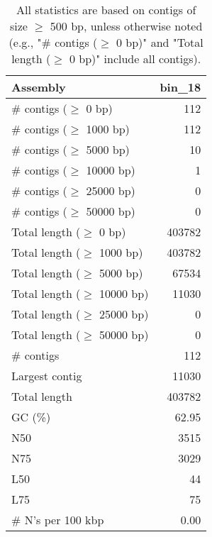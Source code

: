 \documentclass[12pt,a4paper]{article}
\begin{document}
\begin{table}[ht]
\begin{center}
\caption{All statistics are based on contigs of size $\geq$ 500 bp, unless otherwise noted (e.g., "\# contigs ($\geq$ 0 bp)" and "Total length ($\geq$ 0 bp)" include all contigs).}
\begin{tabular}{|l*{1}{|r}|}
\hline
Assembly & bin\_18 \\ \hline
\# contigs ($\geq$ 0 bp) & 112 \\ \hline
\# contigs ($\geq$ 1000 bp) & 112 \\ \hline
\# contigs ($\geq$ 5000 bp) & 10 \\ \hline
\# contigs ($\geq$ 10000 bp) & 1 \\ \hline
\# contigs ($\geq$ 25000 bp) & 0 \\ \hline
\# contigs ($\geq$ 50000 bp) & 0 \\ \hline
Total length ($\geq$ 0 bp) & 403782 \\ \hline
Total length ($\geq$ 1000 bp) & 403782 \\ \hline
Total length ($\geq$ 5000 bp) & 67534 \\ \hline
Total length ($\geq$ 10000 bp) & 11030 \\ \hline
Total length ($\geq$ 25000 bp) & 0 \\ \hline
Total length ($\geq$ 50000 bp) & 0 \\ \hline
\# contigs & 112 \\ \hline
Largest contig & 11030 \\ \hline
Total length & 403782 \\ \hline
GC (\%) & 62.95 \\ \hline
N50 & 3515 \\ \hline
N75 & 3029 \\ \hline
L50 & 44 \\ \hline
L75 & 75 \\ \hline
\# N's per 100 kbp & 0.00 \\ \hline
\end{tabular}
\end{center}
\end{table}
\end{document}
